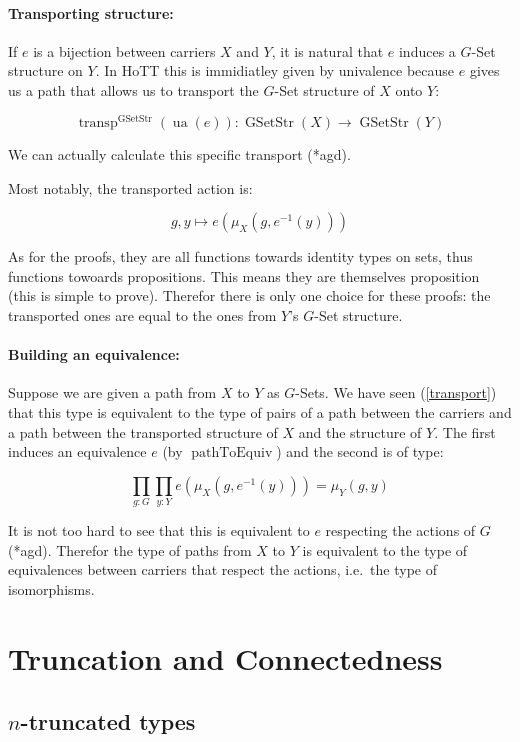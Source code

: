 \documentclass{article}
\DeclareMathOperator{\ua}{ua}
\DeclareMathOperator{\transp}{transp}
\DeclareMathOperator{\gsetstr}{GSetStr}
\DeclareMathOperator{\pathtoequiv}{pathToEquiv}
\begin{document}
\paragraph{Transporting structure:}

If $e$ is a bijection between carriers $X$ and $Y$, it is natural that $e$ induces a $G$-Set structure on $Y$. In HoTT this is immidiatley given by univalence because $e$ gives us a path that allows us to transport the $G$-Set structure of $X$ onto $Y$:

\[\transp^{\gsetstr}(\ua(e)) : \gsetstr(X) \to \gsetstr(Y)\]

We can actually calculate this specific transport (*agd).

Most notably, the transported action is:

\[g,y \mapsto e(\mu_{X}(g , e^{-1}(y)))\]

As for the proofs, they are all functions towards identity types on sets, thus functions towoards propositions. This means they are themselves proposition (this is simple to prove). Therefor there is only one choice for these proofs: the transported ones are equal to the ones from $Y$'s $G$-Set structure.

\paragraph{Building an equivalence:} Suppose we are given a path from $X$ to $Y$ as $G$-Sets. We have seen (\ref{transport}) that this type is equivalent to the type of pairs of a path between the carriers and a path between the transported structure of $X$ and the structure of $Y$. The first induces an equivalence $e$ (by $\pathtoequiv$) and the second is of type:

\[\prod_{g : G} \prod_{y : Y} e(\mu_{X}(g, e^{-1}(y))) = \mu_{Y}(g, y)\]

It is not too hard to see that this is equivalent to $e$ respecting the actions of $G$ (*agd). Therefor the type of paths from $X$ to $Y$ is equivalent to the type of equivalences between carriers that respect the actions, i.e.\ the type of isomorphisms.

\section{Truncation and Connectedness}

\subsection{$n$-truncated types}
\end{document}
